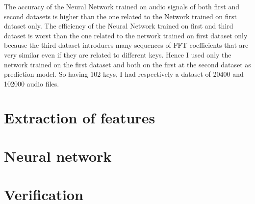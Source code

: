 The accuracy of the Neural Network trained on audio signals of both first and second datasets is higher than the one related to the Network trained on first dataset only.  The efficiency of the Neural Network trained on first and third dataset is worst than the one related to the network trained on first dataset only because the third dataset introduces many sequences of FFT coefficients that are very similar even if they are related to different keys. Hence I used only the network trained on the first dataset and both on the first at the second dataset as prediction model. So having 102 keys, I had respectively a dataset of 20400 and 102000 audio files.

\section{Extraction of features}


\section{Neural network}


\section{Verification}